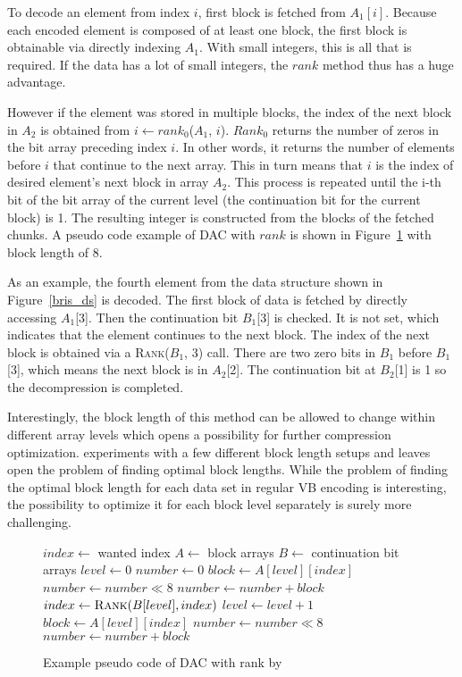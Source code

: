 To decode an element from index $i$, first block is fetched from $A_1[i]$. Because each encoded element is composed of at least one block, the first block is obtainable via directly indexing $A_1$. 
With small integers, this is all that is required. If the data has a lot of small integers, the $rank$ method thus has a huge advantage. 

\pagebreak

However if the element was stored in multiple blocks, the index of the next block in $A_2$ is obtained from $i \gets rank_0$($A_1$, $i$). $Rank_0$ 
returns the number of zeros in the bit array preceding index $i$. In other words, it returns the number of elements before $i$ that continue to the next array. 
This in turn means that $i$ is the index of desired element's next block in array $A_2$. This process is repeated until the i-th bit of the bit array of the current level (the continuation bit for the current 
block) is 1. The resulting integer is constructed from the blocks of the fetched chunks. A pseudo code example of DAC with $rank$ is shown in Figure~\ref{bris_pseudo} with block length of 8. 

As an example, the fourth element from the data structure shown in Figure~\ref{bris_ds} is decoded. The first block of data is fetched by directly accessing $A_1$[3]. Then the 
continuation bit $B_1$[3] is checked. It is not set, which indicates that the element continues to the next block. The index of the next block is obtained via a \textsc{Rank}($B_1$, 3) call. There are two zero 
bits in $B_1$ before $B_1$[3], which means the next block is in $A_2$[2]. The continuation bit at $B_2$[1] is 1 so the decompression is completed.

Interestingly, the block length of this method can be allowed to change within different array levels which opens a possibility for further compression optimization. \citeauthor{Bri09} experiments with a few different block 
length setups and leaves open the problem of finding optimal block lengths. While the problem of finding the optimal block length for each data set in regular VB encoding is interesting, the possibility to
optimize it for each block level separately is surely more challenging.
\begin{figure}[ht]
\centering
\begin{minipage}{0.5\linewidth}
\begin{algorithmic}
\State $index \gets $ wanted index
\State $A \gets $ block arrays
\State $B \gets $ continuation bit arrays
\State $level \gets 0$
\State $number \gets 0$
\State $block \gets A[level][index]$
\State $number \gets number \mathbin{\ll} 8$
\State $number \gets number + block$
\State $index \gets \Call{Rank}{B[level], index}$
\State $level \gets level + 1$
\EndWhile
\State $block \gets A[level][index]$
\State $number \gets number \mathbin{\ll} 8$
\State $number \gets number + block$
\end{algorithmic}
\end{minipage}
\caption{Example pseudo code of DAC with rank by \citeauthor{Bri09}} \label{bris_pseudo}

\end{figure}

